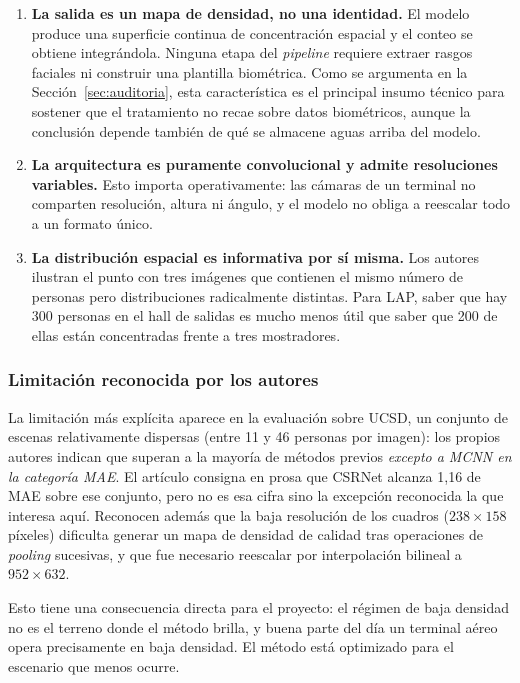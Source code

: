 \begin{enumerate}[leftmargin=1.6em,itemsep=0.3em]
  \item \textbf{La salida es un mapa de densidad, no una identidad.} El
        modelo produce una superficie continua de concentración espacial
        y el conteo se obtiene integrándola. Ninguna etapa del
        \emph{pipeline} requiere extraer rasgos faciales ni construir una
        plantilla biométrica. Como se argumenta en la
        Sección~\ref{sec:auditoria}, esta característica es el principal
        insumo técnico para sostener que el tratamiento no recae sobre
        datos biométricos, aunque la conclusión depende también de qué se
        almacene aguas arriba del modelo.
  \item \textbf{La arquitectura es puramente convolucional y admite
        resoluciones variables.} Esto importa operativamente: las cámaras
        de un terminal no comparten resolución, altura ni ángulo, y el
        modelo no obliga a reescalar todo a un formato único.
  \item \textbf{La distribución espacial es informativa por sí misma.}
        Los autores ilustran el punto con tres imágenes que contienen el
        mismo número de personas pero distribuciones radicalmente
        distintas. Para LAP, saber que hay 300 personas en el hall de
        salidas es mucho menos útil que saber que 200 de ellas están
        concentradas frente a tres mostradores.
\end{enumerate}

\subsubsection*{Limitación reconocida por los autores}

La limitación más explícita aparece en la evaluación sobre UCSD, un
conjunto de escenas relativamente dispersas (entre 11 y 46 personas por
imagen): los propios autores indican que superan a la mayoría de métodos
previos \emph{excepto a MCNN en la categoría MAE}. El artículo consigna
en prosa que CSRNet alcanza 1,16 de MAE sobre ese conjunto, pero no es
esa cifra sino la excepción reconocida la que interesa aquí. Reconocen
además que la baja resolución de
los cuadros ($238\times158$ píxeles) dificulta generar un mapa de
densidad de calidad tras operaciones de \emph{pooling} sucesivas, y que
fue necesario reescalar por interpolación bilineal a $952\times632$.

Esto tiene una consecuencia directa para el proyecto: el régimen de baja
densidad no es el terreno donde el método brilla, y buena parte del día
un terminal aéreo opera precisamente en baja densidad. El método está
optimizado para el escenario que menos ocurre.

